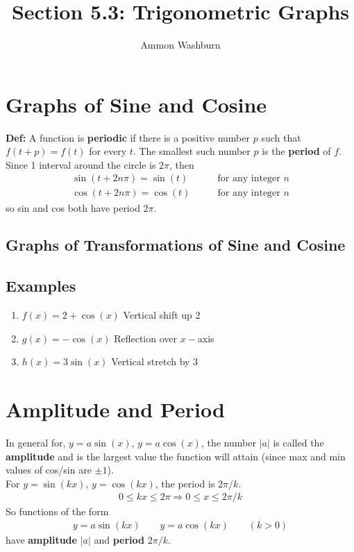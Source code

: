 \documentclass{tufte-handout}
\title{Section 5.3: Trigonometric Graphs}
\author[AW]{Ammon Washburn}
\providecommand{\abs}[1]{| #1 |}
\begin{document}
\section{Graphs of Sine and Cosine}
\textbf{Def:} A function is \textbf{periodic} if there is a positive number $p$ such that $f(t+p) = f(t)$ for every $t$.
The smallest such number $p$ is the \textbf{period} of $f$. \\[5px]
Since 1 interval around the circle is $2\pi$, then
\begin{align*}
\sin(t + 2n\pi) = \sin(t) & \qquad \text{for any integer }n \\
\cos(t + 2n\pi) = \cos(t) & \qquad \text{for any integer }n
\end{align*}
so sin and cos both have period $2\pi$. \\[5px]

\subsection{Graphs of Transformations of Sine and Cosine}

\subsection{Examples}
\begin{enumerate}
\item $f(x) = 2 + \cos(x)$ {\color{blue} Vertical shift up 2}

\item $g(x) = -\cos(x)$ {\color{blue} Reflection over $x-$axis}

\item $h(x) = 3\sin(x)$ {\color{blue} Vertical stretch by $3$}
\end{enumerate}

\section{Amplitude and Period}
In general for, $y = a\sin(x)$, $y = a\cos(x)$, the number $\abs{a}$ is called the \textbf{amplitude} and is the largest value the function will attain (since max and min values of cos/sin are $\pm 1$). \\[5px]
For $y = \sin(kx)$, $y = \cos(kx)$, the period is $2\pi/k$. 
\begin{align*}
0 \leq kx \leq 2\pi \Rightarrow 0 \leq x \leq 2\pi/k
\end{align*}
So functions of the form
\begin{align*}
y = a\sin(kx) \qquad y = a\cos(kx) \qquad (k > 0)
\end{align*}
have \textbf{amplitude} $\abs{a}$ and \textbf{period} $2\pi/k$.
\end{document}
